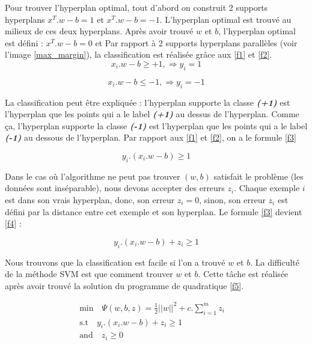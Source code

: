 Pour trouver l'hyperplan optimal, tout d'abord on  construit 2 supports hyperplans $x^T.w - b = 1$ et $x^T.w - b = -1$. L'hyperplan optimal est trouvé au milieux de ces deux hyperplans.
Après avoir trouvé $w$ et $b$, l'hyperplan optimal est défini : $x^T.w - b = 0$ et  Par rapport à 2 supports hyperplans parallèles (voir l'image \ref{max_margin}), la classification est réalisée grâce aux \ref{f1} et \ref{f2}.
\begin{equation}
x_i.w - b \geq +1, \Rightarrow y_i = 1
\label{f1}
\end{equation}

\begin{equation}
x_i.w - b \leq -1, \Rightarrow y_i = -1
\label{f2}
\end{equation}

La classification peut être expliquée : l'hyperplan supporte la classe \textit{\textbf{(+1)}} est l'hyperplan que les points qui a le label \textit{\textbf{(+1)}} au dessus de l'hyperplan. Comme ça, l'hyperplan supporte la classe \textit{\textbf{(-1)}} est l'hyperplan que les points qui a le label \textit{\textbf{(-1)}} au dessous de l'hyperplan. Par rapport aux \ref{f1} et \ref{f2}, on a le formule \ref{f3}

\begin{equation}
y_i.(x_i.w - b) \geq 1
\label{f3}
\end{equation}

Dans le cas où l'algorithme ne peut pas trouver $(w, b)$ satisfait le problème (les données sont inséparable), nous devons accepter des erreurs $z_i$. Chaque exemple $i$ est dans son vrais hyperplan, donc, son erreur $z_i = 0$, sinon, son erreur $z_i$ est défini par la distance entre cet exemple et son hyperplan. Le formule \ref{f3} devient \ref{f4} :

\begin{equation}
y_i.(x_i.w - b) + z_i \geq 1
\label{f4}
\end{equation}

Nous trouvons que la classification est facile si l'on a trouvé $w$ et $b$. La difficulté de la méthode SVM est que comment trouver $w$ et $b$. Cette tâche est réalisée après avoir trouvé la solution du programme de quadratique \ref{f5}.

\begin{equation}
\begin{split}
\mbox{min}\quad \Psi(w, b, z) = \frac{1}{2} ||w||^2 + c.\sum\limits_{i=1}^m z_i\quad \\ \mbox{s.t} \quad y_i.(x_i.w - b) + z_i \geq 1 \\ \mbox{and} \quad z_i \geq 0
\end{split}
\label{f5}
\end{equation}

